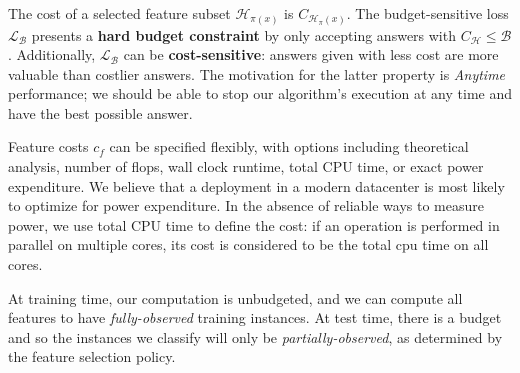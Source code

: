 The cost of a selected feature subset $\mathcal{H}_{\pi(x)}$ is $C_{\mathcal{H}_\pi(x)}$.
The budget-sensitive loss $\mathcal{L}_\mathcal{B}$ presents a \textbf{hard budget constraint} by only accepting answers with $C_{\mathcal{H}} \leq \mathcal{B}$.
Additionally, $\mathcal{L}_\mathcal{B}$ can be \textbf{cost-sensitive}: answers given with less cost are more valuable than costlier answers.
The motivation for the latter property is \emph{Anytime} performance; we should be able to stop our algorithm's execution at any time and have the best possible answer.

Feature costs $c_f$ can be specified flexibly, with options including theoretical analysis, number of flops, wall clock runtime, total CPU time, or exact power expenditure.
We believe that a deployment in a modern datacenter is most likely to optimize for power expenditure.
In the absence of reliable ways to measure power, we use total CPU time to define the cost: if an operation is performed in parallel on multiple cores, its cost is considered to be the total cpu time on all cores.



At training time, our computation is unbudgeted, and we can compute all features to have \emph{fully-observed} training instances.
At test time, there is a budget and so the instances we classify will only be \emph{partially-observed}, as determined by the feature selection policy.

